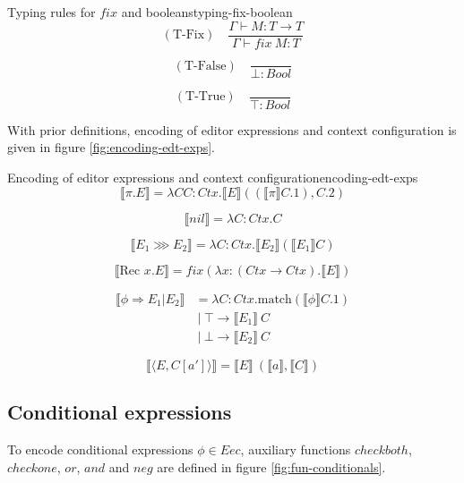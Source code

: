 \documentclass{article}
\newcommand{\enc}[1]{\llbracket #1 \rrbracket}
\newcommand{\conf}[2]{\langle #1,#2 \rangle}
\begin{document}
\begin{myfigure}{Typing rules for $fix$ and booleans}{typing-fix-boolean}
\[
(\text{T-Fix}) \quad \frac{\Gamma \vdash M : T \rightarrow T}{\Gamma \vdash fix \ M : T}
\]

\[
(\text{T-False}) \quad \frac{}{\bot : Bool}
\]

\[
(\text{T-True}) \quad \frac{}{\top : Bool}
\]
\end{myfigure}

With prior definitions, encoding of editor expressions and context configuration is given in figure \ref{fig:encoding-edt-exps}. 

\begin{myfigure}{Encoding of editor expressions and context configuration}{encoding-edt-exps}
\[
\llbracket \pi.E \rrbracket = \lambda CC : Ctx.\llbracket E \rrbracket ((\llbracket \pi \rrbracket C.1), C.2)
\]

\[
\llbracket nil \rrbracket = \lambda C : Ctx.C
\]

\[
\llbracket E_1 \ggg E_2 \rrbracket = \lambda C : Ctx.\llbracket E_2 \rrbracket(\llbracket E_1 \rrbracket C)
\]

\[
\enc{\text{Rec } x.E} = fix(\lambda x : (Ctx \rightarrow Ctx).\enc{E})
\]

\[
\begin{aligned}
\enc{\phi \Rightarrow E_1|E_2} &= \lambda C : Ctx.\text{match} (\enc{\phi}C.1) \\
& \ | \ \top \rightarrow \enc{E_1} \ C \\
& \ | \ \bot \rightarrow \enc{E_2} \ C
\end{aligned}
\]

\[
\enc{\conf{E}{C[a']}} = \enc{E} \ (\enc{a}, \enc{C})
\]
\end{myfigure}

\subsection{Conditional expressions}
To encode conditional expressions $\phi \in Eec$, auxiliary functions $checkboth$, $checkone$, $or$, $and$ and $neg$ are defined in figure \ref{fig:fun-conditionals}.
\end{document}
